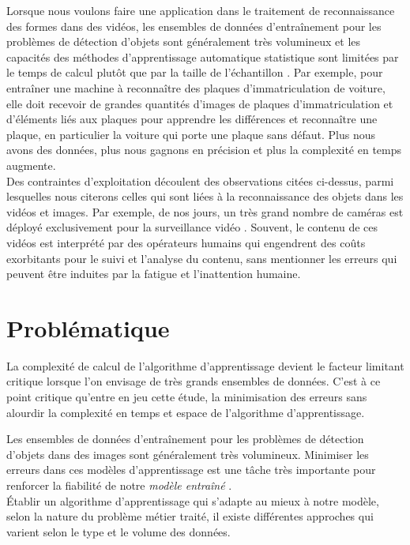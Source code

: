		Lorsque nous voulons faire une application dans le traitement de reconnaissance des formes dans des vidéos, les ensembles de données d'entraînement pour les  problèmes de détection d'objets sont généralement très volumineux et les capacités des méthodes d'apprentissage automatique statistique sont limitées par le temps de calcul plutôt que par la taille de l'échantillon \cite{bottou2010large}.
		Par exemple, pour entraîner une machine à reconnaître des plaques d'immatriculation de voiture, elle doit recevoir de grandes quantités d'images de plaques d'immatriculation et d'éléments liés aux plaques pour apprendre les différences et reconnaître une plaque, en particulier la voiture qui porte une plaque sans défaut. Plus nous avons des données, plus nous gagnons en précision et plus la complexité en temps augmente.\\
		Des contraintes d'exploitation découlent des observations citées ci-dessus, parmi lesquelles nous citerons celles qui sont liées à la reconnaissance des objets dans les vidéos et images. Par exemple, de nos jours, un très grand nombre de caméras est déployé exclusivement pour la surveillance vidéo \cite{ahadjitse2013reconnaissance} . Souvent, le contenu de ces vidéos est interprété par des opérateurs humains qui engendrent des coûts exorbitants pour le suivi et l'analyse du contenu, sans mentionner les erreurs qui peuvent être induites par la fatigue et l'inattention humaine. 
		
		
		
	
	\section{Problématique}
		La complexité de calcul de l'algorithme d'apprentissage devient le facteur limitant critique lorsque l'on envisage de très grands ensembles de données. C'est à ce point critique qu'entre en jeu cette étude, la minimisation des erreurs sans alourdir la complexité en temps et espace de l’algorithme d’apprentissage. 
		
		Les ensembles de données d'entraînement pour les problèmes de détection d'objets dans des images sont généralement très volumineux. Minimiser les erreurs dans ces modèles d’apprentissage est une tâche très importante pour renforcer la fiabilité de notre \emph{modèle entraîné} \cite{ibm2018ml}.\\
		Établir un algorithme d’apprentissage qui s'adapte au mieux à notre modèle, selon la nature du problème métier traité, il existe différentes approches qui varient selon le type et le volume des données.
		

